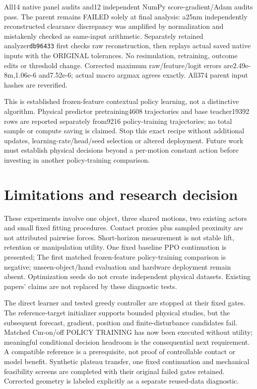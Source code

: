 \documentclass[10 pt]{article}
\begin{document}
All14 native panel audits and12 independent NumPy score-gradient/Adam audits
pass. The parent remains FAILED solely at final analysis: a25nm independently
reconstructed clearance discrepancy was amplified by normalization and mistakenly
checked as same-input arithmetic. Separately retained analyzer\texttt{db96433}
first checks raw reconstruction, then replays actual saved native inputs with the
ORIGINAL tolerances. No resimulation, retraining, outcome edits or threshold
change. Corrected maximum raw/feature/logit errors are2.49e-8m,1.06e-6 and7.52e-6;
actual macro argmax agrees exactly. All374 parent input hashes are reverified.

This is established frozen-feature contextual policy learning, not a distinctive
algorithm. Physical predictor pretraining4608 trajectories and base teacher19392
rows are reported separately from9216 policy-training trajectories; no total
sample or compute saving is claimed. Stop this exact recipe without additional
updates, learning-rate/head/seed selection or altered deployment. Future work
must establish physical decisions beyond a per-motion constant action before
investing in another policy-training comparison.

\section{Limitations and research decision}
These experiments involve one object, three shared motions, two existing actors
and small fixed fitting procedures. Contact proxies plus sampled proximity are
not attributed pairwise forces. Short-horizon measurement is not stable lift,
retention or manipulation utility. One fixed baseline PPO continuation is presented; The first matched frozen-feature policy-training comparison is negative;
unseen-object/hand evaluation and hardware deployment remain absent. Optimization seeds do not create independent
physical datasets. Existing papers' claims are not replaced by these diagnostic tests.

The direct learner and tested greedy controller are stopped at their fixed gates.
The reference-target initializer supports bounded physical studies, but the
subsequent forecast, gradient, position and finite-disturbance candidates fail.
Matched Cm-on/off POLICY TRAINING has now been executed without utility;
meaningful conditional decision headroom is the consequential next requirement. A compatible reference is a
prerequisite, not proof of controllable contact or model benefit. Synthetic plateau transfer, one fixed continuation and mechanical feasibility
screens are completed with their original failed gates retained. Corrected geometry
is labeled explicitly as a separate reused-data diagnostic.
\end{document}
